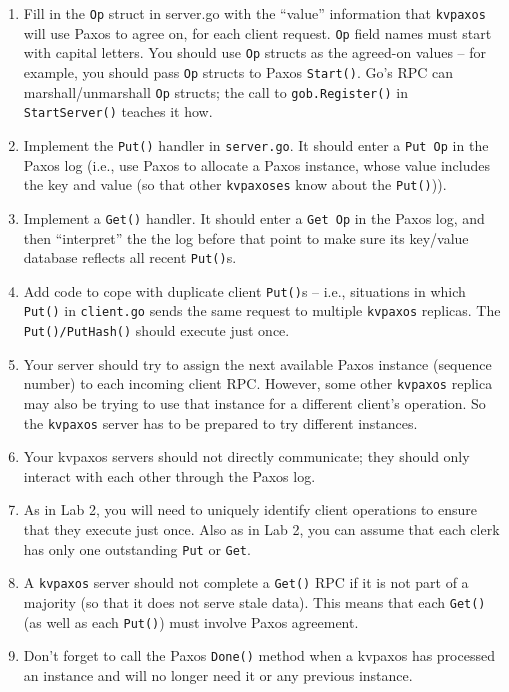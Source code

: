 \documentclass{article}
\newcommand{\code}{\texttt}
\begin{document}
\begin{enumerate}

    \item Fill in the \code{Op} struct in server.go with the ``value'' information that
\code{kvpaxos} will use Paxos to agree on, for each client request. \code{Op}
field names must start with capital letters. You should use \code{Op}
structs as the agreed-on values -- for example, you should pass
\code{Op} structs to Paxos \code{Start()}. Go's RPC can marshall/unmarshall \code{Op}
structs; the call to \code{gob.Register()} in \code{StartServer()} teaches it how.

    \item Implement the \code{Put()} handler in \code{server.go}. It should enter a \code{Put Op} in
the Paxos log (i.e., use Paxos to allocate a Paxos instance, whose
value includes the key and value (so that other \code{kvpaxoses} know
about the \code{Put()})).

    \item Implement a \code{Get()} handler. It should enter a \code{Get Op} in the Paxos log,
and then ``interpret'' the the log before that point to make sure its
key/value database reflects all recent \code{Put()}s.

    \item Add code to cope with duplicate client \code{Put()}s -- i.e., situations in which
\code{Put()} in \code{client.go} sends the same request to multiple \code{kvpaxos}
replicas. The \code{Put()/PutHash()} should execute just once.

    \item Your server should try to assign the next available Paxos instance
(sequence number) to each incoming client RPC. However, some other
\code{kvpaxos} replica may also be trying to use that instance for a different
client's operation. So the \code{kvpaxos} server has to be prepared to try
different instances.

    \item Your kvpaxos servers should not directly communicate; they
should only interact with each other through the Paxos log.

    \item As in Lab 2, you will need to uniquely identify client operations to
ensure that they execute just once. Also as in Lab 2, you can assume
that each clerk has only one outstanding \code{Put} or \code{Get}.

    \item A \code{kvpaxos} server should not complete a \code{Get()} RPC if it is not part
of a majority (so that it does not serve stale data). This means that each
\code{Get()} (as well as each \code{Put()}) must involve Paxos agreement.

    \item Don't forget to call the Paxos \code{Done()} method when a kvpaxos has
processed an instance and will no longer need it or any previous instance.

\end{enumerate}
\end{document}
